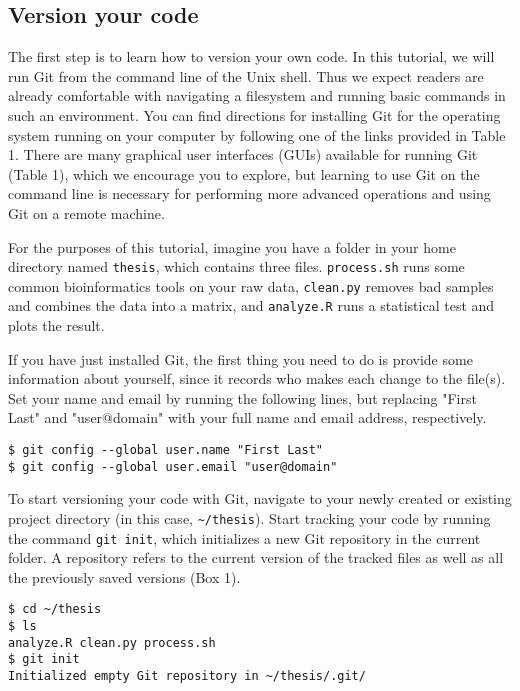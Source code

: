 \subsection{Version your code}

The first step is to learn how to version your own code.
In this tutorial, we will run Git from the command line of the Unix shell.
Thus we expect readers are already comfortable with navigating a filesystem and running basic commands in such an environment.
You can find directions for installing Git for the operating system running on your computer by following one of the links provided in Table 1.
There are many graphical user interfaces (GUIs) available for running Git (Table 1), which we encourage you to explore, but learning to use Git on the command line is necessary for performing more advanced operations and using Git on a remote machine.

For the purposes of this tutorial, imagine you have a folder in your home directory named \verb|thesis|, which contains three files.
\verb|process.sh| runs some common bioinformatics tools on your raw data, \verb|clean.py| removes bad samples and combines the data into a matrix, and \verb|analyze.R| runs a statistical test and plots the result.

If you have just installed Git, the first thing you need to do is provide some information about yourself, since it records who makes each change to the file(s).
Set your name and email by running the following lines, but replacing "First Last" and "user@domain" with your full name and email address, respectively.

\begin{lstlisting}
$ git config --global user.name "First Last"
$ git config --global user.email "user@domain"
\end{lstlisting}

To start versioning your code with Git, navigate to your newly created or existing project directory (in this case, \verb|~/thesis|).
Start tracking your code by running the command \verb|git init|, which initializes a new Git repository in the current folder.
A repository refers to the current version of the tracked files as well as all the previously saved versions (Box 1).

\begin{lstlisting}
$ cd ~/thesis
$ ls
analyze.R clean.py process.sh
$ git init
Initialized empty Git repository in ~/thesis/.git/
\end{lstlisting}

